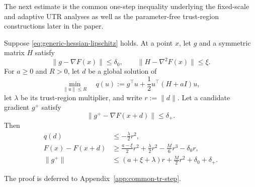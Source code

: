 The next estimate is the common one-step inequality underlying the
fixed-scale and adaptive UTR analyses as well as the parameter-free
trust-region constructions later in the paper.

\begin{lemma}
\label{lem:common-inexact-tr-step}
Suppose \eqref{eq:generic-hessian-lipschitz} holds.
At a point $x$, let $g$ and a symmetric matrix $H$ satisfy
\begin{equation}
    \|g-\nabla F(x)\|\le\delta_0,
    \qquad
    \|H-\nabla^2F(x)\|\le\xi.
    \label{eq:common-current-errors}
\end{equation}
For $a\ge0$ and $R>0$, let $d$ be a global solution of
\begin{equation}
    \min_{\|u\|\le R}
    \quad
    q(u):=
    g^\top u+\frac12u^\top(H+aI)u,
    \label{eq:common-tr-model}
\end{equation}
let $\lambda$ be its trust-region multiplier, and write
$r:=\|d\|$.
Let a candidate gradient $g^+$ satisfy
\begin{equation}
    \|g^+-\nabla F(x+d)\|\le\delta_+.
    \label{eq:common-candidate-error}
\end{equation}
Then
\begin{subequations}
\label{eq:common-tr-estimates}
\begin{align}
    q(d)
    &\le
    -\frac{\lambda}{2}r^2,
    \label{eq:common-model-bound}
    \\
    F(x)-F(x+d)
    &\ge
    \frac{a-\xi}{2}r^2
    +\frac{\lambda}{2}r^2
    -\frac{M}{6}r^3
    -\delta_0r,
    \label{eq:common-function-bound}
    \\
    \|g^+\|
    &\le
    (a+\xi+\lambda)r
    +\frac{M}{2}r^2
    +\delta_0+\delta_+.
    \label{eq:common-gradient-bound}
\end{align}
\end{subequations}
\end{lemma}

The proof is deferred to
Appendix~\ref{app:common-tr-step}.
